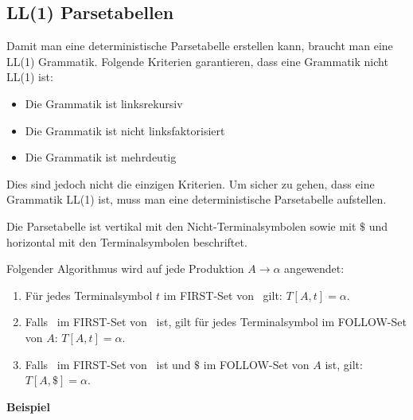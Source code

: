 \subsection{LL(1) Parsetabellen}

Damit man eine deterministische Parsetabelle erstellen kann, braucht man eine
LL(1) Grammatik. Folgende Kriterien garantieren, dass eine Grammatik nicht LL(1)
ist:

\begin{itemize}
	\item Die Grammatik ist linksrekursiv
	\item Die Grammatik ist nicht linksfaktorisiert
	\item Die Grammatik ist mehrdeutig
\end{itemize}

Dies sind jedoch nicht die einzigen Kriterien. Um sicher zu gehen, dass eine
Grammatik LL(1) ist, muss man eine deterministische Parsetabelle aufstellen.

Die Parsetabelle ist vertikal mit den Nicht-Terminalsymbolen sowie mit $\$$
und horizontal mit den Terminalsymbolen beschriftet.

Folgender Algorithmus wird auf jede Produktion $A \rightarrow \alpha$ angewendet:

\begin{enumerate}
	\item Für jedes Terminalsymbol $t$ im FIRST-Set von \textalpha\ gilt: $T[A,t]
		= \alpha$.
	\item Falls \textepsilon\ im FIRST-Set von \textalpha\ ist, gilt für jedes
		Terminalsymbol im FOLLOW-Set von $A$: $T[A,t] = \alpha$.
	\item Falls \textepsilon\ im FIRST-Set von \textalpha\ ist und $\$$ im
		FOLLOW-Set von $A$ ist, gilt: $T[A,\$] = \alpha$.
\end{enumerate}

\textbf{Beispiel}

